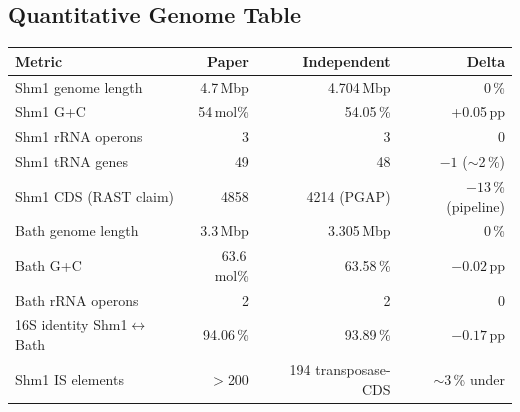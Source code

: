 \documentclass[11pt]{article}
\begin{document}
\subsection{Quantitative Genome Table}
\begin{longtable}{p{5.5cm} r r r}
\toprule
\textbf{Metric} & \textbf{Paper} & \textbf{Independent} & \textbf{Delta} \\
\midrule
\endhead
Shm1 genome length            & 4.7\,Mbp     & 4.704\,Mbp   & 0\,\%           \\
Shm1 G+C                      & 54\,mol\%    & 54.05\,\%    & +0.05\,pp       \\
Shm1 rRNA operons             & 3            & 3            & 0               \\
Shm1 tRNA genes               & 49           & 48           & $-1$ ($\sim$2\,\%) \\
Shm1 CDS (RAST claim)         & 4858         & 4214 (PGAP)  & $-13$\,\% (pipeline) \\
Bath genome length            & 3.3\,Mbp     & 3.305\,Mbp   & 0\,\%           \\
Bath G+C                      & 63.6\,mol\%  & 63.58\,\%    & $-0.02$\,pp     \\
Bath rRNA operons             & 2            & 2            & 0               \\
16S identity Shm1$\leftrightarrow$Bath & 94.06\,\% & 93.89\,\% & $-0.17$\,pp   \\
Shm1 IS elements              & $>$200       & 194 transposase-CDS & $\sim$3\,\% under \\
\bottomrule
\end{longtable}
\end{document}
